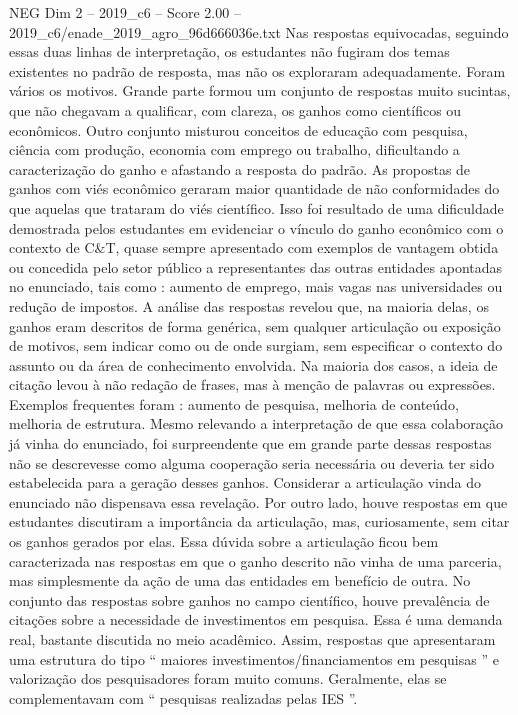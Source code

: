 \begin{textsample}{NEG Dim 2 – 2019\_c6 – Score 2.00 – 2019\_c6/enade\_2019\_agro\_96d666036e.txt}
Nas respostas equivocadas, seguindo essas duas linhas de interpretação, os estudantes não fugiram dos temas existentes no padrão de resposta, mas não os exploraram adequadamente.
Foram vários os motivos.
Grande parte formou um conjunto de respostas muito sucintas, que não chegavam a qualificar, com clareza, os ganhos como científicos ou econômicos.
Outro conjunto misturou conceitos de educação com pesquisa, ciência com produção, economia com emprego ou trabalho, dificultando a caracterização do ganho e afastando a resposta do padrão.
As propostas de ganhos com viés econômico geraram maior quantidade de não conformidades do que aquelas que trataram do viés científico.
Isso foi resultado de uma dificuldade demostrada pelos estudantes em evidenciar o vínculo do ganho econômico com o contexto de C\&T, quase sempre apresentado com exemplos de vantagem obtida ou concedida pelo setor público a representantes das outras entidades apontadas no enunciado, tais como : aumento de emprego, mais vagas nas universidades ou redução de impostos.
A análise das respostas revelou que, na maioria delas, os ganhos eram descritos de forma genérica, sem qualquer articulação ou exposição de motivos, sem indicar como ou de onde surgiam, sem especificar o contexto do assunto ou da área de conhecimento envolvida.
Na maioria dos casos, a ideia de citação levou à não redação de frases, mas à menção de palavras ou expressões.
Exemplos frequentes foram : aumento de pesquisa, melhoria de conteúdo, melhoria de estrutura.
Mesmo relevando a interpretação de que essa colaboração já vinha do enunciado, foi surpreendente que em grande parte dessas respostas não se descrevesse como alguma cooperação seria necessária ou deveria ter sido estabelecida para a geração desses ganhos.
Considerar a articulação vinda do enunciado não dispensava essa revelação.
Por outro lado, houve respostas em que estudantes discutiram a importância da articulação, mas, curiosamente, sem citar os ganhos gerados por elas.
Essa dúvida sobre a articulação ficou bem caracterizada nas respostas em que o ganho descrito não vinha de uma parceria, mas simplesmente da ação de uma das entidades em benefício de outra.
No conjunto das respostas sobre ganhos no campo científico, houve prevalência de citações sobre a necessidade de investimentos em pesquisa.
Essa é uma demanda real, bastante discutida no meio acadêmico.
Assim, respostas que apresentaram uma estrutura do tipo “ maiores investimentos/financiamentos em pesquisas ” e valorização dos pesquisadores foram muito comuns.
Geralmente, elas se complementavam com “ pesquisas realizadas pelas IES ”.

\end{textsample}
